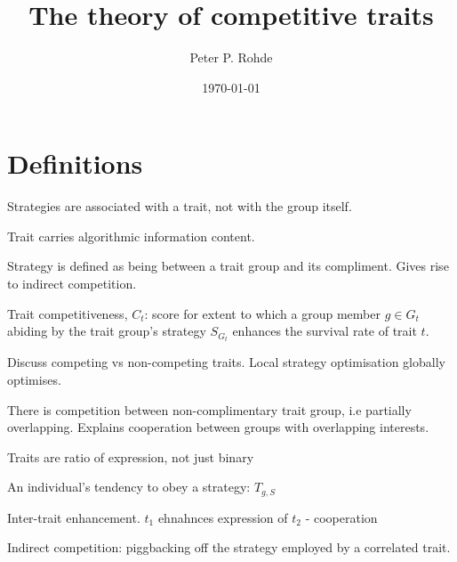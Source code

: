 \documentclass[aps,rmp,twocolumn,amsmath,amssymb,nofootinbib,superscriptaddress]{revtex4}
\begin{document}


%
%

\title{The theory of competitive traits}

%
%

\author{Peter P. Rohde}

\date{\today}

\frenchspacing

%
%

\begin{abstract}
\end{abstract}

\maketitle

\section{Definitions}

Strategies are associated with a trait, not with the group itself.

Trait carries algorithmic information content.

Strategy is defined as being between a trait group and its compliment. Gives rise to indirect competition.

Trait competitiveness, $C_t$: score for extent to which a group member $g\in G_t$ abiding by the trait group's strategy $S_{G_t}$ enhances the survival rate of trait $t$.

Discuss competing vs non-competing traits. Local strategy optimisation globally optimises.

There is competition between non-complimentary trait group, i.e partially overlapping. Explains cooperation between groups with overlapping interests.

Traits are ratio of expression, not just binary

An individual's tendency to obey a strategy: $T_{g,S}$

Inter-trait enhancement. $t_1$ ehnahnces expression of $t_2$ - cooperation

Indirect competition: piggbacking off the strategy employed by a correlated trait.
\end{document}
